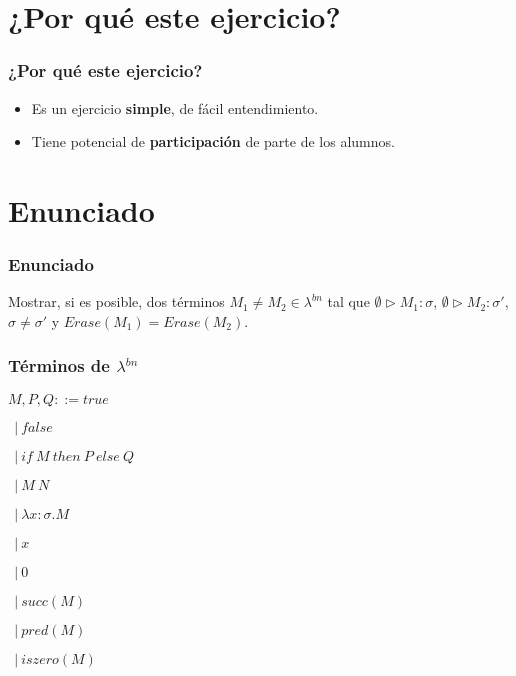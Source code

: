 \documentclass{beamer}
\begin{document}
\section{¿Por qué este ejercicio?}
\begin{frame}
\frametitle{¿Por qué este ejercicio?}
\begin{itemize}
    \item Es un ejercicio \textbf{simple},
        de fácil entendimiento.
    \item Tiene potencial de \textbf{participación}
        de parte de los alumnos.
\end{itemize}

\end{frame}

\section{Enunciado}
\begin{frame}
\frametitle{Enunciado}
Mostrar, si es posible, dos términos
$M_1 \neq M_2 \in \lambda^{bn}$ tal que
$\emptyset \triangleright M_1 : \sigma$,
$\emptyset \triangleright M_2 : \sigma'$, $\sigma \neq \sigma'$
y $Erase(M_1) = Erase(M_2)$.
\end{frame}

\begin{frame}
\frametitle{Términos de $\lambda^{bn}$}

\qquad\qquad\qquad\qquad$M, P, Q ::= true$

\qquad\qquad\qquad\qquad\qquad\qquad$\ \ |\ false$

\qquad\qquad\qquad\qquad\qquad\qquad$\ \ |\ if\ M\ then\ P\ else\ Q$

\qquad\qquad\qquad\qquad\qquad\qquad$\ \ |\ M\ N$

\qquad\qquad\qquad\qquad\qquad\qquad$\ \ |\ \lambda x : \sigma.M$

\qquad\qquad\qquad\qquad\qquad\qquad$\ \ |\ x$

\qquad\qquad\qquad\qquad\qquad\qquad$\ \ |\ 0$

\qquad\qquad\qquad\qquad\qquad\qquad$\ \ |\ succ(M)$

\qquad\qquad\qquad\qquad\qquad\qquad$\ \ |\ pred(M)$

\qquad\qquad\qquad\qquad\qquad\qquad$\ \ |\ iszero(M)$

\end{frame}
\end{document}
